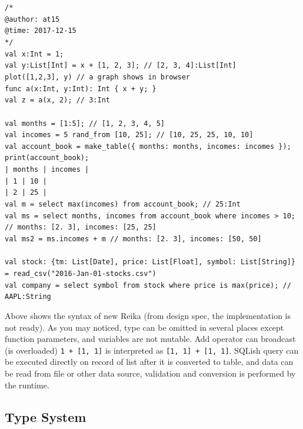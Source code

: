 \documentclass{article}
\begin{document}
\texttt{/* \\
@author: at15 \\
@time: 2017-12-15 \\
*/ \\
val x:Int = 1; \\
val y:List[Int] = x + [1, 2, 3]; // [2, 3, 4]:List[Int] \\
plot([1,2,3], y) // a graph shows in browser \\
func a(x:Int, y:Int): Int \{ x + y; \} \\
val z = a(x, 2); // 3:Int \\
\\
val months = [1:5]; // [1, 2, 3, 4, 5] \\
val incomes = 5 rand\_from [10, 25]; // [10, 25, 25, 10, 10] \\
val account\_book = make\_table(\{ months: months, incomes: incomes \}); \\
print(account\_book); \\
| months | incomes | \\
|   1    |   10    | \\
|   2    |   25    | \\
val m = select max(incomes) from account\_book; // 25:Int\\
val ms = select months, incomes from account\_book where incomes > 10; // {months: [2. 3], incomes: [25, 25]} \\
val ms2 = ms.incomes + m // {months: [2. 3], incomes: [50, 50]} \\
\\
val stock: \{tm: List[Date], price: List[Float], symbol: List[String]\} = read\_csv("2016-Jan-01-stocks.csv") \\
val company = select symbol from stock where price is max(price); // AAPL:String
}

Above shows the syntax of new Reika (from design spec, the implementation is not ready).
As you may noticed, type can be omitted in several places except function parameters, and variables are not mutable.
Add operator can broadcast (is overloaded) \texttt{1 + [1, 1]} is interpreted as \texttt{[1, 1] + [1, 1]}.
SQLish query can be executed directly on record of list after it is converted to table,
and data can be read from file or other data source, validation and conversion is performed by the runtime.

\subsection{Type System}
\label{subsec:type-system}
\end{document}
